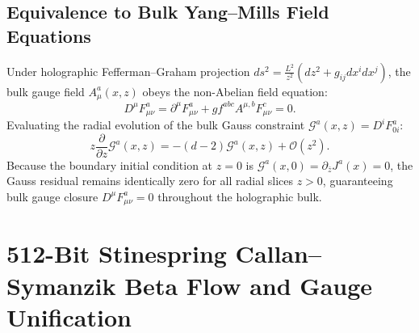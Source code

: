 \documentclass[11pt]{article}
\theoremstyle{plain}
\begin{document}
\subsection{Equivalence to Bulk Yang--Mills Field Equations}
Under holographic Fefferman--Graham projection $ds^2 = \frac{L^2}{z^2}(dz^2 + g_{ij}dx^i dx^j)$, the bulk gauge field $A_\mu^a(x, z)$ obeys the non-Abelian field equation:
\begin{equation}
D^\mu F_{\mu\nu}^a = \partial^\mu F_{\mu\nu}^a + g f^{abc} A^{\mu,b} F_{\mu\nu}^c = 0.
\end{equation}
Evaluating the radial evolution of the bulk Gauss constraint $\mathcal{G}^a(x, z) = D^i F_{0i}^a$:
\begin{equation}
z \frac{\partial}{\partial z} \mathcal{G}^a(x, z) = - (d-2) \mathcal{G}^a(x, z) + \mathcal{O}(z^2).
\end{equation}
Because the boundary initial condition at $z = 0$ is $\mathcal{G}^a(x, 0) = \partial_{\bar{z}} J^a(x) = 0$, the Gauss residual remains identically zero for all radial slices $z > 0$, guaranteeing bulk gauge closure $D^\mu F_{\mu\nu}^a = 0$ throughout the holographic bulk.

\section{512-Bit Stinespring Callan--Symanzik Beta Flow and Gauge Unification}
\label{app:stinespring-beta-flow}
\end{document}

